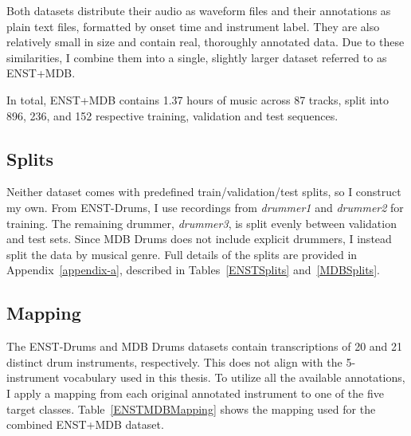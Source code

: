 Both datasets distribute their audio as waveform files and their annotations as plain text files, formatted by onset time and instrument label. They are also relatively small in size and contain real, thoroughly annotated data. Due to these similarities, I combine them into a single, slightly larger dataset referred to as ENST+MDB.

In total, ENST+MDB contains 1.37 hours of music across 87 tracks, split into 896, 236, and 152 respective training, validation and test sequences.

\subsection{Splits}

Neither dataset comes with predefined train/validation/test splits, so I construct my own. From ENST-Drums, I use recordings from \textit{drummer1} and \textit{drummer2} for training. The remaining drummer, \textit{drummer3}, is split evenly between validation and test sets. Since MDB Drums does not include explicit drummers, I instead split the data by musical genre. Full details of the splits are provided in Appendix~\ref{appendix-a}, described in Tables~\ref{ENSTSplits} and~\ref{MDBSplits}.

\subsection{Mapping}

The ENST-Drums and MDB Drums datasets contain transcriptions of 20 and 21 distinct drum instruments, respectively. This does not align with the 5-instrument vocabulary used in this thesis. To utilize all the available annotations, I apply a mapping from each original annotated instrument to one of the five target classes. Table~\ref{ENSTMDBMapping} shows the mapping used for the combined ENST+MDB dataset.

